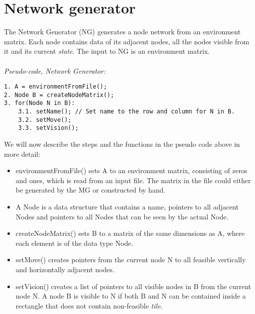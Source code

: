 \section{Network generator}
The Network Generator (NG) generates a node network from an environment matrix. Each node contains data of its adjacent nodes, all the nodes visible from it and its current \emph{state}. The input to NG is an environment matrix.\\
\\
\noindent \emph{Pseudo-code, Network Generator:}
\begin{verbatim}
1. A = environmentFromFile();
2. Node B = createNodeMatrix();
3. for(Node N in B):
    3.1. setName(); // Set name to the row and column for N in B.
    3.2. setMove();
    3.3. setVision();
\end{verbatim}
We will now describe the steps and the functions in the pseudo code above in more detail:
\begin{itemize}
\item environmentFromFile() sets A to an environment matrix, consisting of zeros and ones, which is read from an input file. The matrix in the file could either be generated by the MG or constructed by hand.
\item A Node is a data structure that contains a name, pointers to all adjacent Nodes and pointers to all Nodes that can be seen by the actual Node.
\item createNodeMatrix() sets B to a matrix of the same dimensions as A, where each element is of the data type Node.
\item setMove() creates pointers from the current node N to all feasible vertically and horizontally adjacent nodes.
\item setVision() creates a list of pointers to all visible nodes in B from the current node N. A node B is visible to N if both B and N can be contained inside a rectangle that does not contain non-feasible \emph{tile}.
\end{itemize}
